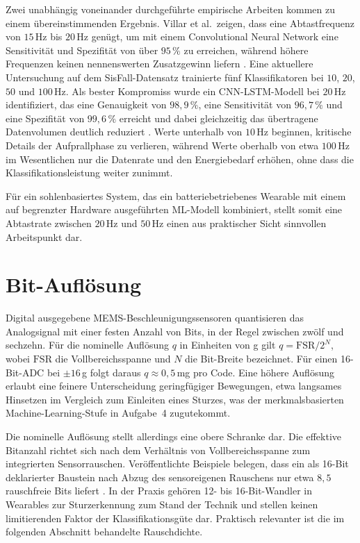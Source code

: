 \documentclass[11pt,a4paper,oneside]{report}
\begin{document}
Zwei unabhängig voneinander durchgeführte empirische Arbeiten kommen zu
einem übereinstimmenden Ergebnis. Villar et al.\ zeigen, dass eine
Abtastfrequenz von $15$\,Hz bis $20$\,Hz genügt, um mit einem
Convolutional Neural Network eine Sensitivität und Spezifität von über
$95\,\%$ zu erreichen, während höhere Frequenzen keinen nennenswerten
Zusatzgewinn liefern \cite{villar2022sampling}. Eine aktuellere
Untersuchung auf dem SisFall-Datensatz trainierte fünf Klassifikatoren
bei $10$, $20$, $50$ und $100$\,Hz. Als bester Kompromiss wurde ein
CNN-LSTM-Modell bei $20$\,Hz identifiziert, das eine Genauigkeit von
$98{,}9\,\%$, eine Sensitivität von $96{,}7\,\%$ und eine
Spezifität von $99{,}6\,\%$ erreicht und dabei gleichzeitig das
übertragene Datenvolumen deutlich reduziert \cite{diaz2026sampling}.
Werte unterhalb von $10$\,Hz beginnen, kritische Details der
Aufprallphase zu verlieren, während Werte oberhalb von etwa $100$\,Hz
im Wesentlichen nur die Datenrate und den Energiebedarf erhöhen, ohne
dass die Klassifikationsleistung weiter zunimmt.

Für ein sohlenbasiertes System, das ein batteriebetriebenes Wearable mit
einem auf begrenzter Hardware ausgeführten ML-Modell kombiniert, stellt
somit eine Abtastrate zwischen $20$\,Hz und $50$\,Hz einen aus praktischer
Sicht sinnvollen Arbeitspunkt dar.

\section{Bit-Auflösung}
\label{sec:resolution}
Digital ausgegebene \ac{MEMS}-Beschleunigungssensoren quantisieren das
Analogsignal mit einer festen Anzahl von Bits, in der Regel zwischen zwölf
und sechzehn. Für die nominelle Auflösung $q$ in Einheiten von g gilt
$q = \mathrm{FSR}/2^{N}$, wobei $\mathrm{FSR}$ die Vollbereichsspanne und
$N$ die Bit-Breite bezeichnet. Für einen 16-Bit-\ac{ADC} bei $\pm 16$\,g
folgt daraus $q \approx 0{,}5$\,mg pro Code. Eine höhere Auflösung
erlaubt eine feinere Unterscheidung geringfügiger Bewegungen, etwa
langsames Hinsetzen im Vergleich zum Einleiten eines Sturzes, was der
merkmalsbasierten Machine-Learning-Stufe in Aufgabe~4 zugutekommt.

Die nominelle Auflösung stellt allerdings eine obere Schranke dar. Die
effektive Bitanzahl richtet sich nach dem Verhältnis von
Vollbereichsspanne zum integrierten Sensorrauschen. Veröffentlichte
Beispiele belegen, dass ein als 16-Bit deklarierter Baustein nach Abzug
des sensoreigenen Rauschens nur etwa $8{,}5$ rauschfreie Bits liefert
\cite{nxp2013an4075}. In der Praxis gehören 12- bis 16-Bit-Wandler in
Wearables zur Sturzerkennung zum Stand der Technik und stellen keinen
limitierenden Faktor der Klassifikationsgüte dar. Praktisch relevanter
ist die im folgenden Abschnitt behandelte Rauschdichte.
\end{document}
